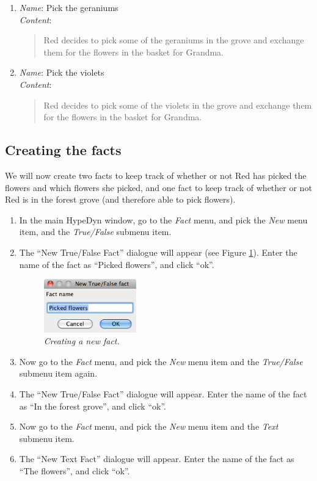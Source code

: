 \documentclass{article}
\begin{document}
\begin{enumerate}
  \item \textit{Name}: Pick the geraniums\\
  \textit{Content}: 
  \begin{quotation}
  \noindent Red decides to pick some of the geraniums in the grove and exchange
  them for the flowers in the basket for Grandma.
  \end{quotation}
  \item \textit{Name}: Pick the violets\\
  \textit{Content}: 
  \begin{quotation}
  \noindent Red decides to pick some of the violets in the grove and exchange
  them for the flowers in the basket for Grandma.
  \end{quotation}
\end{enumerate}

\subsection{Creating the facts}

We will now create two facts to keep track of whether or not Red has picked the
flowers and which flowers she picked, and one fact to keep track of whether or
not Red is in the forest grove (and therefore able to pick flowers).

\begin{enumerate}
  \item In the main HypeDyn window, go to the \textit{Fact} menu, and pick the
  \textit{New} menu item, and the \textit{True/False} submenu item. 
  \item The ``New True/False Fact'' dialogue will appear (see Figure
  \ref{fig:tut3:newfact}). Enter the name of the fact as ``Picked flowers'', and
  click ``ok''.

\begin{figure}[h]
  \centering
  \includegraphics[width=4cm]{images/hypedyn-tutorial-3-figure-9}
  \caption{\textit{Creating a new fact.}}
  \label{fig:tut3:newfact}
\end{figure}

  \item Now go to the \textit{Fact} menu, and pick the
  \textit{New} menu item and the \textit{True/False} submenu item again. 
  \item The ``New True/False Fact'' dialogue will appear. Enter
  the name of the fact as ``In the forest grove'', and click ``ok''.
  \item Now go to the \textit{Fact} menu, and pick the
  \textit{New} menu item and the \textit{Text} submenu item. 
  \item The ``New Text Fact'' dialogue will appear. Enter
  the name of the fact as ``The flowers'', and click ``ok''.
\end{enumerate}
\end{document}
